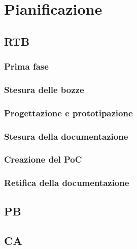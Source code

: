 \section{Pianificazione}

\subsection{RTB}

\subsubsection{Prima fase}

\subsubsection{Stesura delle bozze}

\subsubsection{Progettazione e prototipazione}

\subsubsection{Stesura della documentazione}

\subsubsection{Creazione del PoC}

\subsubsection{Retifica della documentazione}

\subsection{PB}

\subsection{CA}
